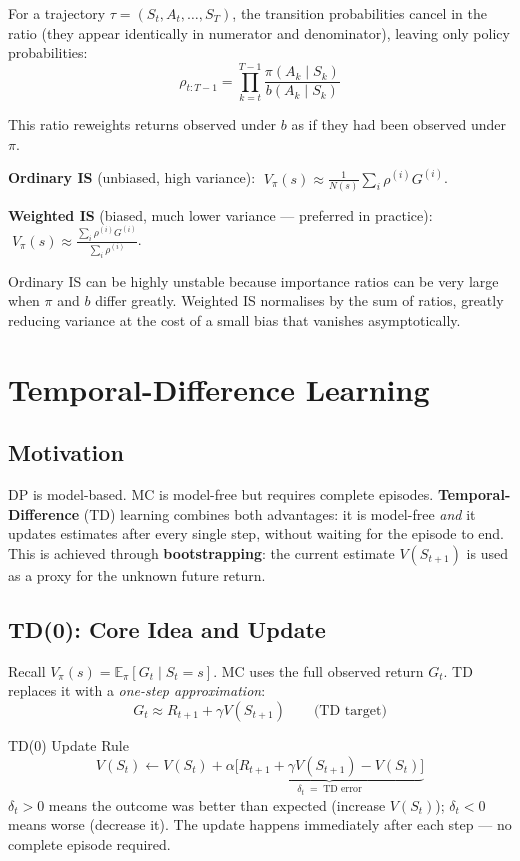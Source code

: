 \documentclass[11pt,a4paper]{article}
\newcommand{\E}{\mathbb{E}}
\newcommand{\term}[1]{\textcolor{DefGreen}{\textbf{#1}}}
\begin{document}
For a trajectory $\tau = (S_t,A_t,\ldots,S_T)$, the transition probabilities cancel in the ratio (they appear identically in numerator and denominator), leaving only policy probabilities:
\[
\rho_{t:T-1} = \prod_{k=t}^{T-1} \frac{\pi(A_k\mid S_k)}{b(A_k\mid S_k)}
\]

This ratio reweights returns observed under $b$ as if they had been observed under $\pi$.

\textbf{Ordinary IS} (unbiased, high variance): $\;V_\pi(s) \approx \frac{1}{N(s)}\sum_i \rho^{(i)} G^{(i)}$.

\textbf{Weighted IS} (biased, much lower variance --- preferred in practice): $\;V_\pi(s) \approx \frac{\sum_i \rho^{(i)} G^{(i)}}{\sum_i \rho^{(i)}}$.

Ordinary IS can be highly unstable because importance ratios can be very large when $\pi$ and $b$ differ greatly. Weighted IS normalises by the sum of ratios, greatly reducing variance at the cost of a small bias that vanishes asymptotically.

\section{Temporal-Difference Learning}

\subsection{Motivation}

DP is model-based. MC is model-free but requires complete episodes. \term{Temporal-Difference} (TD) learning combines both advantages: it is model-free \emph{and} it updates estimates after every single step, without waiting for the episode to end. This is achieved through \term{bootstrapping}: the current estimate $V(S_{t+1})$ is used as a proxy for the unknown future return.

\subsection{TD(0): Core Idea and Update}

Recall $V_\pi(s) = \E_\pi[G_t\mid S_t=s]$. MC uses the full observed return $G_t$. TD replaces it with a \emph{one-step approximation}:
\[
G_t \approx R_{t+1} + \gamma V(S_{t+1}) \qquad \text{(TD target)}
\]

\begin{defbox}{TD(0) Update Rule}
\[
V(S_t) \leftarrow V(S_t) + \alpha \underbrace{\bigl[R_{t+1} + \gamma V(S_{t+1}) - V(S_t)\bigr]}_{\delta_t\;=\;\text{TD error}}
\]
$\delta_t > 0$ means the outcome was better than expected (increase $V(S_t)$); $\delta_t < 0$ means worse (decrease it). The update happens immediately after each step --- no complete episode required.
\end{defbox}
\end{document}
